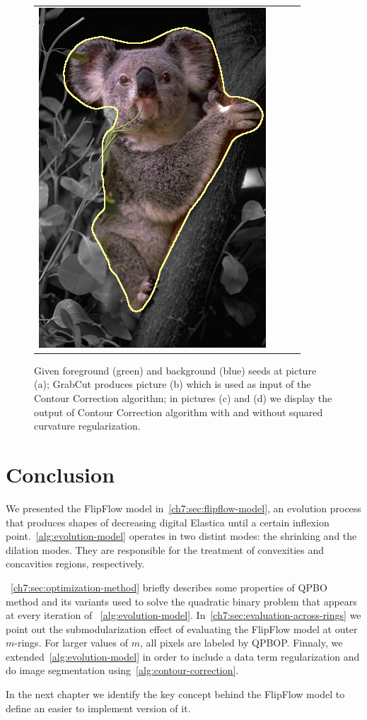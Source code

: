 \begin{figure}
\begin{tabular}{cccc}
 	\includegraphics[scale=0.25]{figures/chapter6/segmentation/coala/mt_improve/radius_5/data_0.50/sq_1.00/length_0.50/it_50/corrected-seg.png}
\end{tabular}	
\caption{Given foreground (green) and background (blue) seeds at picture (a); GrabCut produces picture (b) which is used as input of the Contour Correction algorithm; in pictures (c) and (d) we display the output of Contour Correction algorithm with and without squared curvature regularization. }
\label{fig:ch6-segmentation}
\end{figure}

\section{Conclusion}
\label{ch7:sec:conclusion}
We presented the FlipFlow model in~\cref{ch7:sec:flipflow-model}, an evolution process that produces shapes of decreasing digital Elastica until a certain inflexion point.~\cref{alg:evolution-model} operates in two distint modes: the shrinking and the dilation modes. They are responsible for the treatment of convexities and concavities regions, respectively. 


~\cref{ch7:sec:optimization-method} briefly describes some properties of QPBO method and its variants used to solve the quadratic binary problem that appears at every iteration of ~\cref{alg:evolution-model}. In~\cref{ch7:sec:evaluation-across-rings} we point out the submodularization effect of evaluating the FlipFlow model at outer $m$-rings. For larger values of $m$, all pixels are labeled by QPBOP. Finnaly, we extended~\cref{alg:evolution-model} in order to include a data term regularization and do image segmentation using~\cref{alg:contour-correction}.


In the next chapter we identify the key concept behind the FlipFlow model to define an easier to implement version of it.

